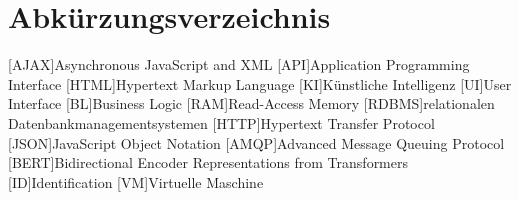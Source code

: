 \section*{Abkürzungsverzeichnis}
\begin{acronym}
	[AJAX]{Asynchronous JavaScript and XML}
	[API]{Application Programming Interface}
	[HTML]{Hypertext Markup Language}
	[KI]{Künstliche Intelligenz}
	[UI]{User Interface}
	[BL]{Business Logic}
	[RAM]{Read-Access Memory}
	[RDBMS]{relationalen Datenbankmanagementsystemen}
	[HTTP]{Hypertext Transfer Protocol}
	[JSON]{JavaScript Object Notation}
	[AMQP]{Advanced Message Queuing Protocol}
	[BERT]{Bidirectional Encoder Representations from Transformers}
	[ID]{Identification}
	[VM]{Virtuelle Maschine}
\end{acronym}
